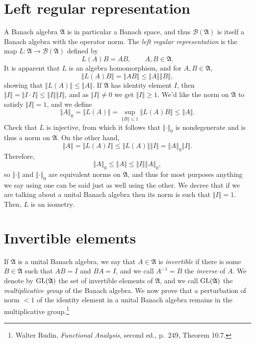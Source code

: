 \documentclass{article}
\newcommand{\GL}{\ensuremath\mathrm{GL}}
\newcommand{\norm}[1]{\left\Vert #1 \right\Vert}
\theoremstyle{definition}
\begin{document}
\section{Left regular representation}
A Banach algebra $\mathfrak{A}$ is in particular a Banach space, and thus $\mathscr{B}(\mathfrak{A})$
is itself a Banach algebra with the operator norm. The {\em left regular representation} is the map $L:\mathfrak{A} \to \mathscr{B}(\mathfrak{A})$ defined by
\[
L(A)B=AB, \qquad A,B \in \mathfrak{A}.
\]
It is apparent that $L$ is an algebra homomorphism, and for $A,B \in \mathfrak{A}$,
\[
\norm{L(A)B} = \norm{AB} \leq \norm{A} \norm{B},
\]
showing that $\norm{L(A)} \leq \norm{A}$. If $\mathfrak{A}$ has identity element $I$, then
$\norm{I}=\norm{I\cdot I} \leq \norm{I} \norm{I}$, and as $\norm{I} \neq 0$ we get $\norm{I} \geq 1$.
We'd like the norm on $\mathfrak{A}$ to satisfy $\norm{I}=1$, and we define 
\[
\norm{A}_0=\norm{L(A)}=\sup_{\norm{B} \leq 1} \norm{L(A)B} \leq \norm{A}.
\]
Check that $L$ is injective, from which it follows that $\norm{\cdot}_0$ is nondegenerate and is thus a norm on $\mathfrak{A}$. On the other hand,
\[
\norm{A} = \norm{L(A)I} \leq \norm{L(A)} \norm{I}=\norm{A}_0 \norm{I}.
\]
Therefore,
\[
\norm{A}_0 \leq \norm{A} \leq \norm{I} \norm{A}_0,
\]
so $\norm{\cdot}$ and $\norm{\cdot}_0$ are equivalent norms on $\mathfrak{A}$, and thus for most purposes anything we say using one can be said just as well using the other.
We decree that if we are talking about a unital Banach algebra then its norm is such that $\norm{I}=1$. Then, $L$ is an isometry.


\section{Invertible elements}
If $\mathfrak{A}$ is a unital Banach algebra, we say that $A \in \mathfrak{A}$ is {\em invertible} if there is some $B \in \mathfrak{A}$ such that
$AB=I$ and $BA=I$, and we call $A^{-1}=B$ the {\em inverse} of $A$. We denote by
 $\GL(\mathfrak{A})$ the set of invertible elements of $\mathfrak{A}$, and we call $\GL(\mathfrak{A})$ the {\em multiplicative group} of the Banach algebra.
We now prove that a   perturbation of norm $<1$ of the identity element in a unital Banach algebra remains in the multiplicative group.\footnote{Walter Rudin, {\em Functional Analysis}, second ed., p.~249, Theorem 10.7.}
 
\end{document}
